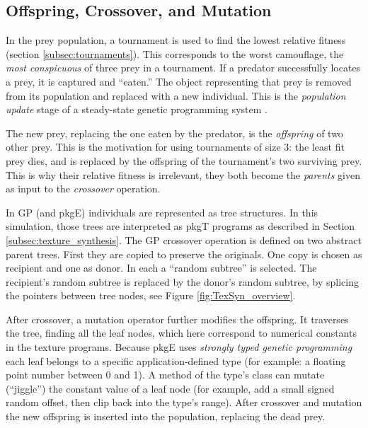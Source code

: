 \documentclass[acmtog,
    anonymous,
    review
    ]{acmart}
\newcommand{\jargon}[1]{\textit{#1}}
\newcommand{\texsyn}[0]{pkgT}
\newcommand{\lazypredator}[0]{pkgE}
\begin{document}

\subsection{Offspring, Crossover, and Mutation}
In the prey population, a tournament is used to find the lowest relative fitness (section \ref{subsec:tournaments}). This corresponds to the worst camouflage, the \jargon{most conspicuous} of three prey in a tournament. If a predator successfully locates a prey, it is captured and “eaten.” The object representing that prey is removed from its population and replaced with a new individual. This is the \jargon{population update} stage of a steady-state genetic programming system \cite{syswerda_study_1991}.
\par
The new prey, replacing the one eaten by the predator, is the \jargon{offspring} of two other prey. This is the motivation for using tournaments of size 3: the least fit prey dies, and is replaced by the offspring of the tournament's two surviving prey. This is why their relative fitness is irrelevant, they both become the \jargon{parents} given as input to the \jargon{crossover} operation.
\par
In GP (and \lazypredator{}) individuals are represented as tree structures. In this simulation, those trees are interpreted as \texsyn{} programs as described in Section \ref{subsec:texture_synthesis}. The GP crossover operation is defined on two abstract parent trees. First they are copied to preserve the originals. One copy is chosen as recipient and one as donor. In each a “random subtree” is selected. The recipient's random subtree is replaced by the donor's random subtree, by splicing the pointers between tree nodes, see Figure \ref{fig:TexSyn_overview}.
\par
After crossover, a mutation operator further modifies the offspring. It traverses the tree, finding all the leaf nodes, which here correspond to numerical constants in the texture programs. Because \lazypredator{} uses \jargon{strongly typed genetic programming} \cite{montana_strongly_1995} each leaf belongs to a specific application-defined type (for example: a floating point number between 0 and 1). A method of the type's class can mutate (“jiggle”) the constant value of a leaf node (for example, add a small signed random offset, then clip back into the type's range). After crossover and mutation the new offspring is inserted into the population, replacing the dead prey.
\par
\end{document}
